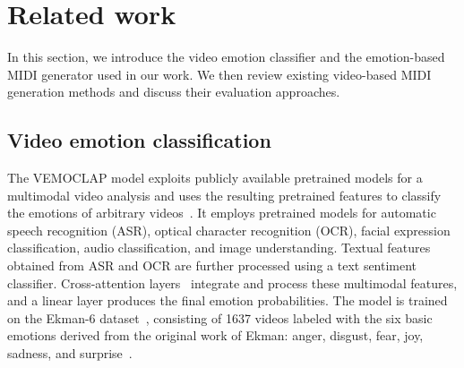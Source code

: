\section{Related work}



In this section, we introduce the video emotion classifier and the emotion-based MIDI generator used in our work. We then review existing video-based MIDI generation methods and discuss their evaluation approaches.


\subsection{Video emotion classification}

The VEMOCLAP model exploits publicly available pretrained models for a multimodal video analysis and uses the resulting pretrained features to classify the emotions of arbitrary videos~\cite{vemoclap,trailer}. It employs pretrained models for automatic speech recognition (ASR), optical character recognition (OCR), facial expression classification, audio classification, and image understanding.
Textual features obtained from ASR and OCR are further processed using a text sentiment classifier. 
Cross-attention layers~\cite{transformer} integrate and process these multimodal features, and a linear layer produces the final emotion probabilities. 
The model is trained on the Ekman-6 dataset~\cite{ekman6}, consisting of 1637 videos labeled with the six basic emotions derived from the original work of Ekman: anger, disgust, fear, joy, sadness, and surprise~. 

